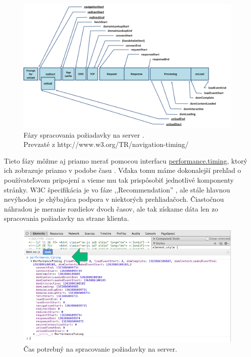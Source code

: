 \begin{figure}[H]
	\centering
	\includegraphics[width=1.0\textwidth]{img/w3c-timing-overview.png}
	\caption[Fázy spracovania požiadavky na server]{
		Fázy spracovania požiadavky na server \cite{timing}.\\
		Prevzaté z http://www.w3.org/TR/navigation-timing/}
	\label{fig: timing}
\end{figure}

Tieto fázy môžme aj priamo merať pomocou interfacu \url{performance.timing}, ktorý ich zobrazuje priamo v podobe času \cite{1000ms}. Vďaka tomu máme dokonalejší prehľad o používateľovom pripojení a vieme mu tak prispôsobiť jednotlivé komponenty stránky. W3C špecifikácia je vo fáze ,,Recommendation'' \cite{timing}, ale stále hlavnou nevýhodou je chýbajúca podpora v niektorých prehliadačoch. Čiastočnou náhradou je meranie rozdielov dvoch časov, ale tak získame dáta len zo spracovania požiadavky na strane klienta.

\begin{figure}[H]
	\centering
	\includegraphics[width=1.0\textwidth]{img/1000ms.png}
	\caption[Čas potrebný na spracovanie požiadavky na server]{
		Čas potrebný na spracovanie požiadavky na server.}
	\label{fig: 1000ms}
\end{figure}

